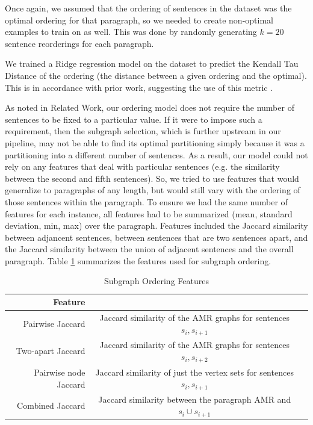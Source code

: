 \documentclass[12pt]{article}
\begin{document}
Once again, we assumed that the ordering of sentences in the dataset was the
optimal ordering for that paragraph, so we needed to create non-optimal
examples to train on as well. This was done by randomly generating
$k=20$ sentence reorderings for each paragraph.

We trained a Ridge regression model on the dataset to predict the Kendall Tau Distance of the ordering
(the distance between a given ordering and the optimal). This is in accordance with prior work, suggesting
the use of this metric \cite{lapata2006automatic}.

As noted in Related Work, our ordering model does not require the number of
sentences to be fixed to a particular value. If it were to impose such a
requirement, then the subgraph selection, which is further upstream in our
pipeline, may not be able to find its optimal partitioning simply because it
was a partitioning into a different number of sentences. As a result, our model
could not rely on any features that deal with particular sentences (e.g. the
similarity between the second and fifth sentences). So, we tried to use
features that would generalize to paragraphs of any length, but would still
vary with the ordering of those sentences within the paragraph. To ensure we 
had the same number of features for each instance, all features had to be summarized (mean, standard deviation, min, max) over the
paragraph. Features included the Jaccard similarity between adjancent
sentences, between sentences that are two sentences apart, and the Jaccard
similarity between the union of adjacent sentences and the overall paragraph.
Table \ref{tab:order_features} summarizes the features used for subgraph ordering.

\begin{table}
\centering
\label{tab:order_features}
\begin{tabular}{|r|c|c|}
\hline
Feature & \\ \hline\hline
Pairwise Jaccard & Jaccard similarity of the AMR graphs for sentences $s_i,s_{i+1}$ \\ \hline
Two-apart Jaccard & Jaccard similarity of the AMR graphs for sentences $s_i,s_{i+2}$ \\ \hline
Pairwise node Jaccard & Jaccard similarity of just the vertex sets for sentences $s_i,s_{i+1}$ \\ \hline
Combined Jaccard & Jaccard similarity between the paragraph AMR and $s_i \cup
s_{i+1}$ \\ \hline
\end{tabular}
\caption{Subgraph Ordering Features}
\end{table}
\end{document}
